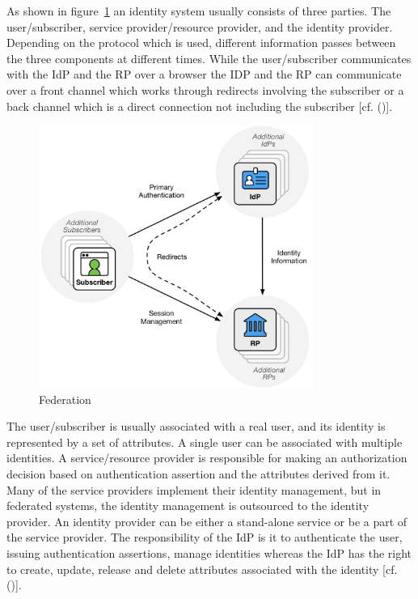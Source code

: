 {{	
	As shown in figure~\ref{fig:federation} an identity system usually consists of three parties. The user/subscriber, service provider/resource provider, and the identity provider. Depending on the protocol which is used, different information passes between the three components at different times. While the user/subscriber communicates with the IdP and the RP over a browser the IDP and the RP can communicate over a front channel which works through redirects involving the subscriber or a back channel which is a direct connection not including the subscriber [cf. (\cite{NIST:2017:DIGFA})]. 
	\begin{figure}[h]
		\centering
		\includegraphics[width=0.8\textwidth]{images/federation}
		\caption[Federation]{Federation}
		\label{fig:federation}
	\end{figure}
	
	
	The user/subscriber is usually associated with a real user, and its identity is represented by a set of attributes. A single user can be associated with multiple identities. A service/resource provider is responsible for making an authorization decision based on authentication assertion and the attributes derived from it. Many of the service providers implement their identity management, but in federated systems, the identity management is outsourced to the identity provider. An identity provider can be either a stand-alone service or be a part of the service provider. The responsibility of the IdP is it to authenticate the user, issuing authentication assertions, manage identities whereas the IdP has the right to create, update, release and delete attributes associated with the identity [cf. (\cite{Birell:2013:FIMS})]. 
	
}}
